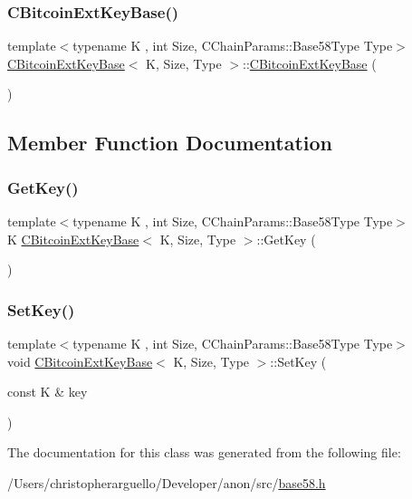 \subsubsection{\texorpdfstring{C\+Bitcoin\+Ext\+Key\+Base()}{CBitcoinExtKeyBase()}\hspace{0.1cm}{\footnotesize\ttfamily [3/3]}}
{\footnotesize\ttfamily template$<$typename K , int Size, C\+Chain\+Params\+::\+Base58\+Type Type$>$ \\
\mbox{\hyperlink{class_c_bitcoin_ext_key_base}{C\+Bitcoin\+Ext\+Key\+Base}}$<$ K, Size, Type $>$\+::\mbox{\hyperlink{class_c_bitcoin_ext_key_base}{C\+Bitcoin\+Ext\+Key\+Base}} (\begin{DoxyParamCaption}{ }\end{DoxyParamCaption})\hspace{0.3cm}{\ttfamily [inline]}}



\subsection{Member Function Documentation}
\mbox{\label{class_c_bitcoin_ext_key_base_a528399b89529212a44a08250c5f29d68}} 
\subsubsection{\texorpdfstring{Get\+Key()}{GetKey()}}
{\footnotesize\ttfamily template$<$typename K , int Size, C\+Chain\+Params\+::\+Base58\+Type Type$>$ \\
K \mbox{\hyperlink{class_c_bitcoin_ext_key_base}{C\+Bitcoin\+Ext\+Key\+Base}}$<$ K, Size, Type $>$\+::Get\+Key (\begin{DoxyParamCaption}{ }\end{DoxyParamCaption})\hspace{0.3cm}{\ttfamily [inline]}}

\mbox{\label{class_c_bitcoin_ext_key_base_aa6041045bb68b3f24d92f5e3b96aeef6}} 
\subsubsection{\texorpdfstring{Set\+Key()}{SetKey()}}
{\footnotesize\ttfamily template$<$typename K , int Size, C\+Chain\+Params\+::\+Base58\+Type Type$>$ \\
void \mbox{\hyperlink{class_c_bitcoin_ext_key_base}{C\+Bitcoin\+Ext\+Key\+Base}}$<$ K, Size, Type $>$\+::Set\+Key (\begin{DoxyParamCaption}\item[{const K \&}]{key }\end{DoxyParamCaption})\hspace{0.3cm}{\ttfamily [inline]}}



The documentation for this class was generated from the following file\+:\begin{DoxyCompactItemize}
\item 
/\+Users/christopherarguello/\+Developer/anon/src/\mbox{\hyperlink{base58_8h}{base58.\+h}}\end{DoxyCompactItemize}
